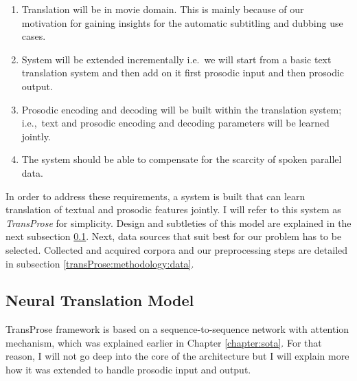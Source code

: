 \begin{enumerate}
    \item Translation will be in movie domain. This is mainly because of our motivation for gaining insights for the automatic subtitling and dubbing use cases. 
    \item System will be extended incrementally i.e.~we will start from a basic text translation system and then add on it first prosodic input and then prosodic output. 
    \item Prosodic encoding and decoding will be built within the translation system; i.e.,~text and prosodic encoding and decoding parameters will be learned jointly. 
    \item The system should be able to compensate for the scarcity of spoken parallel data. 
\end{enumerate}

In order to address these requirements, a system is built that can learn translation of textual and prosodic features jointly. I will refer to this system as \textit{TransProse} for simplicity. Design and subtleties of this model are explained in the next subsection \ref{transProse:methodology:model}. Next, data sources that suit best for our problem has to be selected. Collected and acquired corpora and our preprocessing steps are detailed in subsection \ref{transProse:methodology:data}. 

\subsection{Neural Translation Model}
\label{transProse:methodology:model}


TransProse framework is based on a sequence-to-sequence network with attention mechanism, which was explained earlier in Chapter \ref{chapter:sota}. For that reason, I will not go deep into the core of the architecture but I will explain more how it was extended to handle prosodic input and output. 

